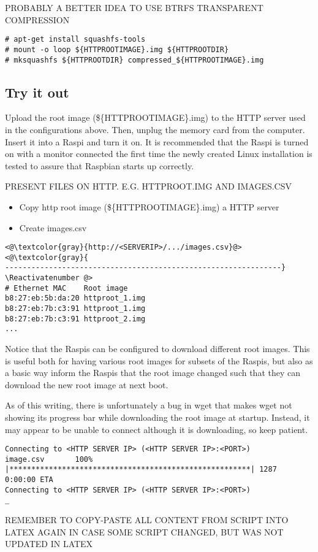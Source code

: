 PROBABLY A BETTER IDEA TO USE BTRFS TRANSPARENT COMPRESSION

\begin{lstlisting}[]
# apt-get install squashfs-tools
# mount -o loop ${HTTPROOTIMAGE}.img ${HTTPROOTDIR}
# mksquashfs ${HTTPROOTDIR} compressed_${HTTPROOTIMAGE}.img
\end{lstlisting}
\FloatBarrier
\vspace{-5mm}

\subsection{Try it out}

Upload the root image (\$\{HTTPROOTIMAGE\}.img) to the HTTP server used in the
configurations above. Then, unplug the memory card from the computer.
Insert it into a \ac{Raspi} and
turn it on. It is recommended that the \ac{Raspi} is turned on with a monitor
connected the first time the newly created Linux installation is tested to
assure that Raspbian starts up correctly.


PRESENT FILES ON HTTP. E.G. HTTPROOT.IMG AND IMAGES.CSV


\begin{itemize}
    \item Copy http root image (\$\{HTTPROOTIMAGE\}.img) a HTTP server
    \item Create images.csv
\end{itemize}


\Suppressnumber\begin{lstlisting}[]
<@\textcolor{gray}{http://<SERVERIP>/.../images.csv}@>
<@\textcolor{gray}{
---------------------------------------------------------------}
\Reactivatenumber @>
# Ethernet MAC    Root image
b8:27:eb:5b:da:20 httproot_1.img
b8:27:eb:7b:c3:91 httproot_1.img
b8:27:eb:7b:c3:91 httproot_2.img
...
\end{lstlisting}
\FloatBarrier
\vspace{-5mm}

Notice that the \ac{Raspi}s can be configured to download different root images.
This is useful both for having various root images for subsets of the \ac{Raspi}s,
but also as a basic way inform the \ac{Raspi}s that the root image changed such
that they can download the new root image at next boot.

As of this writing, there is unfortunately a bug in wget that makes wget not showing
its progress bar while downloading the root image at startup. Instead, it may appear
to be unable to connect although it is downloading, so keep patient.

\begin{lstlisting}[]
Connecting to <HTTP SERVER IP> (<HTTP SERVER IP>:<PORT>)
image.csv       100% |*******************************************************| 1287   0:00:00 ETA
Connecting to <HTTP SERVER IP> (<HTTP SERVER IP>:<PORT>)
_
\end{lstlisting}
\FloatBarrier
\vspace{-5mm}


REMEMBER TO COPY-PASTE ALL CONTENT FROM SCRIPT INTO LATEX AGAIN IN CASE SOME
SCRIPT CHANGED, BUT WAS NOT UPDATED IN LATEX
